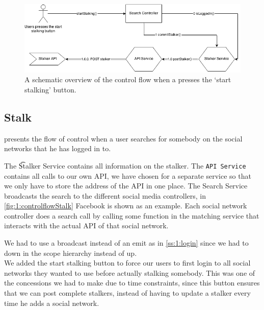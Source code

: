 		\begin{figure}
			\includegraphics[width=\textwidth]{./img/1_start_stalking_flow}
			\caption{A schematic overview of the control flow when a presses the `start stalking' button.}
			\label{fig:1:controlflowStartStalk}
		\end{figure}


\subsection{Stalk}
	 presents the flow of control when a user searches for somebody on the social networks that he has logged in to.

	The \t{Stalker Service} contains all information on the stalker. The \texttt{API Service} contains all calls to our own API, we have chosen for a separate service so that we only have to store the address of the API in one place. The Search Service broadcasts the search to the different social media controllers, in \cref{fig:1:controlflowStalk} Facebook is shown as an example. Each social network controller does a search call by calling some function in the matching service that interacts with the actual API of that social network.


	We had to use a broadcast instead of an emit as in \cref{ss:1:login} since we had to down in the scope hierarchy instead of up. \\

	We added the start stalking button to force our users to first login to all social networks they wanted to use before actually stalking somebody. This was one of the concessions we had to make due to time constraints, since this button ensures that we can post complete stalkers, instead of having to update a stalker every time he adds a social network. 

